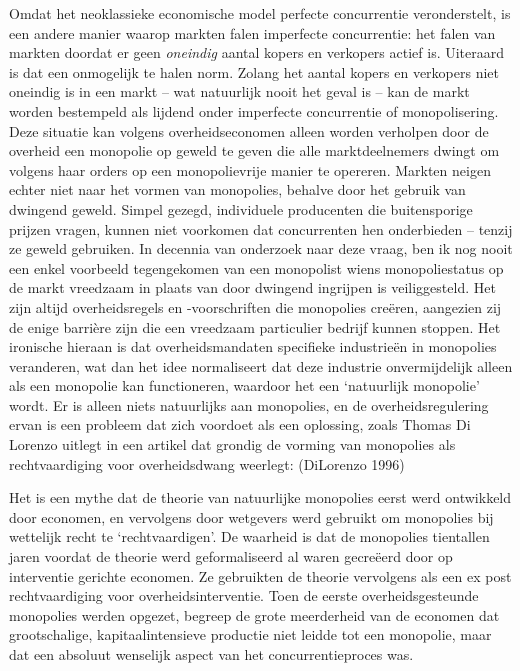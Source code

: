 \documentclass[
  a5paper,
  smalldemyvopaper,11pt,twoside,onecolumn,openright,extrafontsizes,
hidelinks]{memoir}
\begin{document}
Omdat het neoklassieke economische model perfecte concurrentie
veronderstelt, is een andere manier waarop markten falen imperfecte
concurrentie: het falen van markten doordat er geen \emph{oneindig}
aantal kopers en verkopers actief is. Uiteraard is dat een onmogelijk te
halen norm. Zolang het aantal kopers en verkopers niet oneindig is in
een markt -- wat natuurlijk nooit het geval is -- kan de markt worden
bestempeld als lijdend onder imperfecte concurrentie of monopolisering.
Deze situatie kan volgens overheidseconomen alleen worden verholpen door
de overheid een monopolie op geweld te geven die alle marktdeelnemers
dwingt om volgens haar orders op een monopolievrije manier te opereren.
Markten neigen echter niet naar het vormen van monopolies, behalve door
het gebruik van dwingend geweld. Simpel gezegd, individuele producenten
die buitensporige prijzen vragen, kunnen niet voorkomen dat concurrenten
hen onderbieden -- tenzij ze geweld gebruiken. In decennia van onderzoek
naar deze vraag, ben ik nog nooit een enkel voorbeeld tegengekomen van
een monopolist wiens monopoliestatus op de markt vreedzaam in plaats van
door dwingend ingrijpen is veiliggesteld. Het zijn altijd
overheidsregels en -voorschriften die monopolies creëren, aangezien zij
de enige barrière zijn die een vreedzaam particulier bedrijf kunnen
stoppen. Het ironische hieraan is dat overheidsmandaten specifieke
industrieën in monopolies veranderen, wat dan het idee normaliseert dat
deze industrie onvermijdelijk alleen als een monopolie kan functioneren,
waardoor het een `natuurlijk monopolie' wordt. Er is alleen niets
natuurlijks aan monopolies, en de overheidsregulering ervan is een
probleem dat zich voordoet als een oplossing, zoals Thomas Di Lorenzo
uitlegt in een artikel dat grondig de vorming van monopolies als
rechtvaardiging voor overheidsdwang weerlegt: (DiLorenzo 1996)

Het is een mythe dat de theorie van natuurlijke monopolies eerst werd
ontwikkeld door economen, en vervolgens door wetgevers werd gebruikt om
monopolies bij wettelijk recht te `rechtvaardigen'. De waarheid is dat
de monopolies tientallen jaren voordat de theorie werd geformaliseerd al
waren gecreëerd door op interventie gerichte economen. Ze gebruikten de
theorie vervolgens als een ex post rechtvaardiging voor
overheidsinterventie. Toen de eerste overheidsgesteunde monopolies
werden opgezet, begreep de grote meerderheid van de economen dat
grootschalige, kapitaalintensieve productie niet leidde tot een
monopolie, maar dat een absoluut wenselijk aspect van het
concurrentieproces was.
\end{document}
